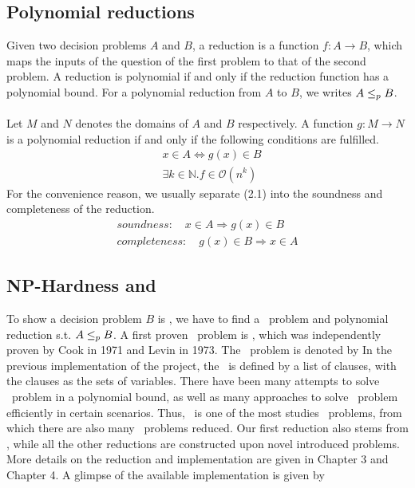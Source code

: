 \subsection{Polynomial reductions}
Given two decision problems $A$ and $B$, 
a reduction is a function $f: A \rightarrow B$, 
which maps the inputs of the question of the first problem 
to that of the second problem. A reduction is polynomial 
if and only if the reduction function has a polynomial bound. 
For a polynomial reduction from $A$ to $B$, we writes $A \leq_p B$. \\ \\
Let $M$ and $N$ denotes the domains of $A$ and $B$ respectively. 
A function $g: M \rightarrow N$ is a polynomial reduction 
if and only if the following conditions are fulfilled.
\begin{align}  
    &x \in A \iff g(x) \in B \\
    &\exists k\in \mathbb{N}. f \in \mathcal{O}(n^k)
\end{align}
For the convenience reason, we usually separate (2.1) into the soundness and completeness of the reduction.
\begin{align}
    soundness: \quad x \in A \Longrightarrow g(x) \in B \\
    completeness: \quad g(x) \in B \Longrightarrow x \in A
\end{align}

\subsection{NP-Hardness and \SAT}
To show a decision problem $B$ is \NPH, 
we have to find a \NPH\ problem and polynomial reduction 
s.t. $A \leq_p B$. A first proven \NPH\ problem is \SAT, 
which was independently proven by Cook in 1971 and Levin in 1973. 
The \SAT\ problem is denoted by 
In the previous implementation of the project, the \SAT\ is defined by a list of clauses, with the clauses as the sets of variables.
There have been many attempts to solve \SAT\ problem in a polynomial bound, 
as well as many approaches to solve \SAT\ problem efficiently in certain scenarios.
Thus, \SAT\ is one of the most studies \NPH\ problems, from which there are also many \NPH\ problems reduced. 
Our first reduction also stems from \SAT, while all the other reductions are constructed upon novel introduced problems. 
More details on the reduction and implementation are given in Chapter 3 and Chapter 4. A glimpse of the available 
implementation is given by

